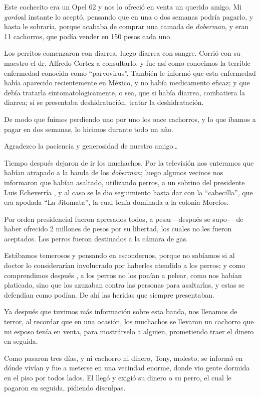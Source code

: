 \documentclass[letterpaper, 12pt]{book}
\begin{document}
Este cochecito era un Opel 62 y nos lo ofreció en venta un querido amigo. Mi {\it gordo}al instante lo aceptó, pensando que en una o dos semanas podría pagarlo, y hasta le sobraría, porque acababa de comprar una camada de {\it doberman}, y eran 11 cachorros, que podía vender en 150 pesos cada uno. 

Los perritos comenzaron con diarrea, luego diarrea con sangre. Corrió con su maestro el dr. Alfredo Cortez a consultarlo, y fue así como conocimos la terrible enfermedad conocida como ``parvovirus''. También le informó que esta enfermedad había aparecido recientemente en México, y no había medicamento eficaz; y que debía tratarla sintomatologicamente, o sea, que si había diarrea, combatiera la diarrea; si se presentaba deshidratación, tratar la deshidratación.

De modo que fuimos perdiendo uno por uno los once cachorros, y lo que íbamos a pagar en dos semanas, lo hicimos durante todo un año.

Agradezco la paciencia y generosidad de nuestro amigo\ldots

Tiempo después dejaron de ir los muchachos. Por la televisión nos enteramos que habían atrapado a la banda de los {\it doberman}; luego algunos vecinos nos informaron que habían asaltado, utilizando perros, a un sobrino del presidente Luis Echeverría , y al caso se le dio seguimiento hasta dar con la ``cabecilla'', que era apodada ``La Jitomata'', la cual tenía dominada a la colonia Morelos. 

Por orden presidencial fueron apresados todos, a pesar---después se supo--- de haber ofrecido 2 millones de pesos por su libertad, los cuales no les fueron aceptados. Los perros fueron destinados a la cámara de gas.

Estábamos temerosos y pensando en escondernos, porque no sabíamos si al doctor lo considerarían involucrado por haberles atendido a los perros; y como comprendimos después , a los perros no los ponían a pelear, como nos habían platicado, sino que los azuzaban contra las personas para asaltarlas, y estas se defendían como podían. De ahí las heridas que siempre presentaban.

Ya después que tuvimos más información sobre esta banda, nos llenamos de terror, al recordar que en una ocasión, los muchachos se llevaron un cachorro que mi esposo tenía en venta, para mostrárselo a alguien, prometiendo traer el dinero en seguida.

Como pasaron tres días, y ni cachorro ni dinero, Tony, molesto, se informó en dónde vivían y fue a meterse en una vecindad enorme, donde vio gente dormida en el piso por todos lados.  El llegó y exigió su dinero o su perro, el cual le pagaron en seguida, pidiendo disculpas.
\end{document}
